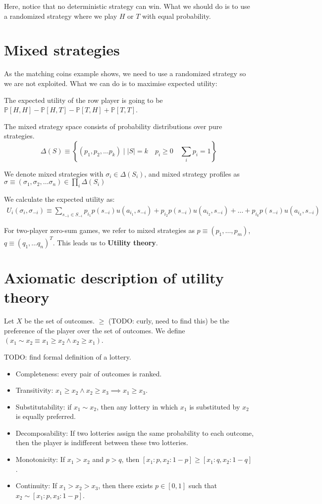 \documentclass[11pt]{book}
\renewcommand{\P}[1]{\ensuremath{\mathbb{P} \left[ #1 \right] }}
\begin{document}
Here, notice that no deterministic strategy can win. What we should do is to
use a randomized strategy where we play $H$ or $T$ with equal probability.

\section{Mixed strategies}

As the matching coins example shows, we need to use a randomized strategy
so we are not exploited. What we can do is to maximise expected utility:

The expected utility of the row player is going to be $\P{H, H} - \P{H, T} - \P{T, H} + \P{T, T}$.

The mixed strategy space consists of probability distributions over pure strategies.
$$\Delta(S) \equiv \left\{ (p_1, p_2, \dots p_k) \mid |S| = k \quad p_i \geq 0 \quad \sum_i p_i = 1\right\}$$

We denote mixed strategies with $\sigma_i \in \Delta(S_i)$, and mixed
strategy profiles as $\sigma \equiv  (\sigma_1, \sigma_2, \dots \sigma_n) \in \prod_i \Delta(S_i)$


We calculate the expected utility as:
\begin{align*}
    U_i(\sigma_i, \sigma_{-i}) \equiv
    \sum_{s_{-1} \in S_{-i}} 
p_{i_1} p(s_{-i}) u(a_{i_1}, s_{-i}) +
p_{i_2} p(s_{-i}) u(a_{i_2}, s_{-i}) + \dots +
    p_{i_k} p(s_{-i}) u(a_{i_k}, s_{-i})
\end{align*}

For two-player zero-sum games, we refer to mixed strategies as 
$p \equiv (p_1, \dots, p_m)$,
$q \equiv (q_1, \dots q_n)^T$. This leads us to \textbf{Utility theory}.


\section{Axiomatic description of utility theory}
Let $X$ be the set of outcomes. $\geq$ (TODO: curly, need to find this) be the
preference of the player over the set of outcomes.
We define $\left( x_1 \sim x_2 \equiv x_1 \geq x_2 \land x_2 \geq x_1 \right)$.

TODO: find formal definition of a lottery.

\begin{itemize}
    \item Completeness: every pair of outcomes is ranked.
    \item Transitivity: $x_1 \geq x_2 \land x_2 \geq x_3 \implies x_1 \geq x_3$.
    \item Substitutability: if $x_1 \sim x_2$, then any lottery in which $x_1$
        is substituted by $x_2$ is equally preferred.
    \item Decomposability: If two lotteries assign the same probability to
        each outcome, then the player is indifferent between these two lotteries.
    \item Monotonicity: If $x_1 > x_2$ and $p > q$, then $[x_1: p, x_2 : 1- p] \geq [x_1 : q, x_2 : 1 - q ]$.
    \item Continuity: If $x_1 > x_2 > x_3$, then there exists $p \in [0, 1]$
        such that $x_2 \sim [x_1: p, x_3: 1 - p]$.
\end{itemize}
\end{document}

